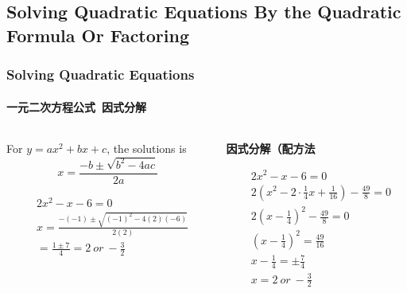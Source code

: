\documentclass[
	11pt, %
	handout,
]{beamer}
\begin{document}

\subsection{Solving Quadratic Equations By the Quadratic Formula Or Factoring}



\begin{frame}
	\frametitle{Solving Quadratic Equations}
	\framesubtitle{一元二次方程公式\ 因式分解}

	\begin{columns}[t] 
		\begin{column}{0.5\textwidth} %
				\begin{theorem}[一元二次方程公式]
					For $y = ax^2 + bx + c$, the solutions is \\
					\begin{equation*}
						x=\frac{-b \pm \sqrt{b^2 - 4ac}}{2a}
					\end{equation*}
				\end{theorem}

				\begin{example}
					\begin{equation*}
						\begin{aligned}
							&2x^2 -x - 6 = 0 \\
							&x = \frac{-(-1) \pm \sqrt{(-1)^2 - 4(2)(-6)}}{2(2)} \\
							&= \frac{1 \pm 7}{4} = 2\ or\ -\frac{3}{2} 
						\end{aligned}
					\end{equation*}
				\end{example}
		\end{column}
		\begin{column}{0.45\textwidth} %
				\textbf{因式分解（配方法}

				\begin{example}
					\begin{equation*}
						\begin{aligned}
							&2x^2 -x - 6 = 0 \\
							&2(x^2 - 2 \cdot \frac{1}{4}x +  \frac{1}{16})-\frac{49}{8} = 0 \\
							&2(x - \frac{1}{4})^2-\frac{49}{8} = 0 \\
							&(x - \frac{1}{4})^2=\frac{49}{16} \\
							& x - \frac{1}{4}=\pm \frac{7}{4} \\
							&x = 2 \ or \ -\frac{3}{2}
						\end{aligned}
					\end{equation*}
				\end{example}
    \end{column}
	\end{columns}
\end{frame}
\end{document}
